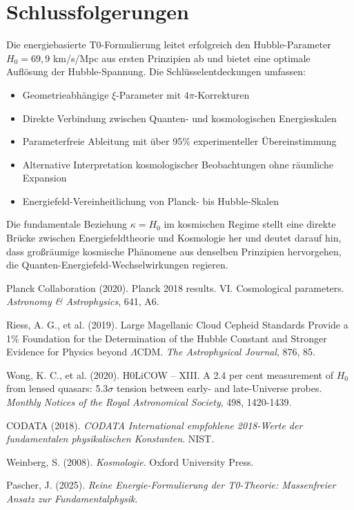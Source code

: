 \documentclass[12pt,a4paper]{article}
\begin{document}
	\section{Schlussfolgerungen}
	
	Die energiebasierte T0-Formulierung leitet erfolgreich den Hubble-Parameter $H_0 = 69{,}9$ km/s/Mpc aus ersten Prinzipien ab und bietet eine optimale Auflösung der Hubble-Spannung. Die Schlüsselentdeckungen umfassen:
	
	\begin{itemize}
		\item Geometrieabhängige $\xi$-Parameter mit $4\pi$-Korrekturen
		\item Direkte Verbindung zwischen Quanten- und kosmologischen Energieskalen
		\item Parameterfreie Ableitung mit über 95\% experimenteller Übereinstimmung
		\item Alternative Interpretation kosmologischer Beobachtungen ohne räumliche Expansion
		\item Energiefeld-Vereinheitlichung von Planck- bis Hubble-Skalen
	\end{itemize}
	
	Die fundamentale Beziehung $\kappa = H_0$ im kosmischen Regime stellt eine direkte Brücke zwischen Energiefeldtheorie und Kosmologie her und deutet darauf hin, dass großräumige kosmische Phänomene aus denselben Prinzipien hervorgehen, die Quanten-Energiefeld-Wechselwirkungen regieren.
	
	\begin{thebibliography}{99}
		
		Planck Collaboration (2020). Planck 2018 results. VI. Cosmological parameters. \textit{Astronomy \& Astrophysics}, 641, A6.
		
		Riess, A. G., et al. (2019). Large Magellanic Cloud Cepheid Standards Provide a 1\% Foundation for the Determination of the Hubble Constant and Stronger Evidence for Physics beyond $\Lambda$CDM. \textit{The Astrophysical Journal}, 876, 85.
		
		Wong, K. C., et al. (2020). H0LiCOW -- XIII. A 2.4 per cent measurement of $H_0$ from lensed quasars: 5.3$\sigma$ tension between early- and late-Universe probes. \textit{Monthly Notices of the Royal Astronomical Society}, 498, 1420-1439.
		
		CODATA (2018). \textit{CODATA International empfohlene 2018-Werte der fundamentalen physikalischen Konstanten}. NIST.
		
		Weinberg, S. (2008). \textit{Kosmologie}. Oxford University Press.
		
		Pascher, J. (2025). \textit{Reine Energie-Formulierung der T0-Theorie: Massenfreier Ansatz zur Fundamentalphysik}.
		
	\end{thebibliography}
	
\end{document}
